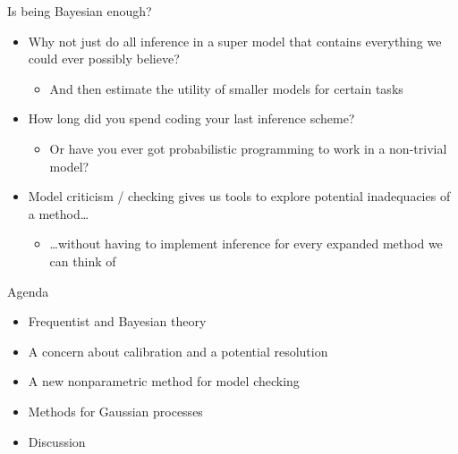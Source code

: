 \begin{frame}{Is being Bayesian enough?}
  \begin{itemize}
    \item Why not just do all inference in a super model that contains everything we could ever possibly believe?
    \pause
    \begin{itemize}
      \item And then \eg estimate the utility of smaller models for certain tasks
    \end{itemize}
    \vspace{\baselineskip}
    \pause
    \item How long did you spend coding your last inference scheme?
    \begin{itemize}
      \item Or have you ever got probabilistic programming to work in a non-trivial model?
    \end{itemize}
    \vspace{\baselineskip}
    \pause
    \item Model criticism / checking gives us tools to explore potential inadequacies of a method\dots
    \begin{itemize}
       \item \dots without having to implement inference for every expanded method we can think of
     \end{itemize}
  \end{itemize}
\end{frame}

\begin{frame}{Agenda}
  \begin{itemize}
    \item Frequentist and Bayesian theory
    \vspace{\baselineskip}
    \item A concern about calibration and a potential resolution
    \vspace{\baselineskip}
    \item A new nonparametric method for model checking
    \vspace{\baselineskip}
    \item Methods for Gaussian processes
    \vspace{\baselineskip}
    \item Discussion
  \end{itemize}
\end{frame}

